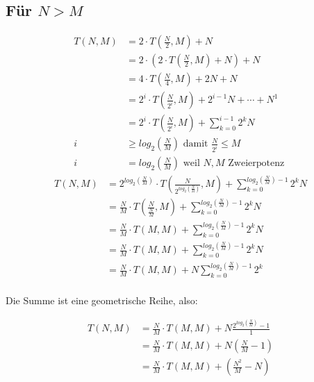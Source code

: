\documentclass[parskip=half,a4paper]{scrartcl}
\begin{document}
\subsection*{Für $N > M$}


\begin{equation*}
\begin{aligned}
    T(N, M) & =  2 \cdot T(\frac{N}{2}, M) + N\\
    & =  2 \cdot (2 \cdot T(\frac{N}{2}, M) + N) + N\\
    & =  4 \cdot T(\frac{N}{4}, M) + 2N + N\\
    & =  2^i \cdot T(\frac{N}{2^i}, M) + 2^{i-1}N + \cdots + N^{1}\\
    & =  2^i \cdot T(\frac{N}{2^i}, M) + \sum_{k=0}^{i-1} 2^kN \\
    i & \ge log_2(\frac{N}{M}) \text{ damit } \frac{N}{2^i} \le M \\
    i & = log_2(\frac{N}{M}) \text{ weil $N,M$ Zweierpotenz }
\end{aligned}
\end{equation*}
\begin{equation*}
\begin{aligned}
    T(N, M) & =  2^{log_2(\frac{N}{M})} \cdot T(\frac{N}{2^{log_2(\frac{N}{M})}}, M) + \sum_{k=0}^{log_2(\frac{N}{M})-1} 2^kN \\
    & =  \frac{N}{M} \cdot T(\frac{N}{\frac{N}{M}}, M) + \sum_{k=0}^{log_2(\frac{N}{M})-1} 2^kN \\
    & =  \frac{N}{M} \cdot T(M, M) + \sum_{k=0}^{log_2(\frac{N}{M})-1} 2^kN \\
    & =  \frac{N}{M} \cdot T(M, M) + \sum_{k=0}^{log_2(\frac{N}{M})-1} 2^kN \\
    & =  \frac{N}{M} \cdot T(M, M) + N \sum_{k=0}^{log_2(\frac{N}{M})-1} 2^k \\
\end{aligned}
\end{equation*}
\begin{center}
Die Summe ist eine geometrische Reihe, also:
\end{center}
\begin{equation*}
\begin{aligned}
    T(N, M) & =  \frac{N}{M} \cdot T(M, M) + N \frac{2^{log_2(\frac{N}{M})} - 1}{1} \\
    & =  \frac{N}{M} \cdot T(M, M) + N (\frac{N}{M} - 1) \\
    & =  \frac{N}{M} \cdot T(M, M) + (\frac{N^2}{M} - N)
\end{aligned}
\end{equation*}
\end{document}
